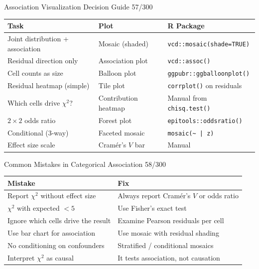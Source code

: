 \documentclass[10pt]{beamer}
\newcommand{\smark}[1]{\hfill{\scriptsize\color{codegray}#1}}
\begin{document}
\begin{frame}{Association Visualization Decision Guide}
\smark{57/300}
\centering\small
\begin{tabular}{@{}lll@{}}
    \toprule
    \textbf{Task} & \textbf{Plot} & \textbf{R Package} \\
    \midrule
    Joint distribution + association     & Mosaic (shaded)      & \texttt{vcd::mosaic(shade=TRUE)} \\
    Residual direction only              & Association plot      & \texttt{vcd::assoc()} \\
    Cell counts as size                  & Balloon plot          & \texttt{ggpubr::ggballoonplot()} \\
    Residual heatmap (simple)            & Tile plot             & \texttt{corrplot()} on residuals \\
    Which cells drive $\chi^2$?          & Contribution heatmap  & Manual from \texttt{chisq.test()} \\
    $2 \times 2$ odds ratio              & Forest plot           & \texttt{epitools::oddsratio()} \\
    Conditional (3-way)                  & Faceted mosaic        & \texttt{mosaic(\textasciitilde\ | z)} \\
    Effect size scale                    & Cramér's $V$ bar      & Manual \\
    \bottomrule
\end{tabular}
\end{frame}

\begin{frame}{Common Mistakes in Categorical Association}
\smark{58/300}
\centering\small
\begin{tabular}{@{}ll@{}}
    \toprule
    \textbf{Mistake} & \textbf{Fix} \\
    \midrule
    Report $\chi^2$ without effect size        & Always report Cramér's $V$ or odds ratio \\
    $\chi^2$ with expected $< 5$               & Use Fisher's exact test \\
    Ignore which cells drive the result        & Examine Pearson residuals per cell \\
    Use bar chart for association               & Use mosaic with residual shading \\
    No conditioning on confounders             & Stratified / conditional mosaics \\
    Interpret $\chi^2$ as causal               & It tests association, not causation \\
    \bottomrule
\end{tabular}
\end{frame}
\end{document}
